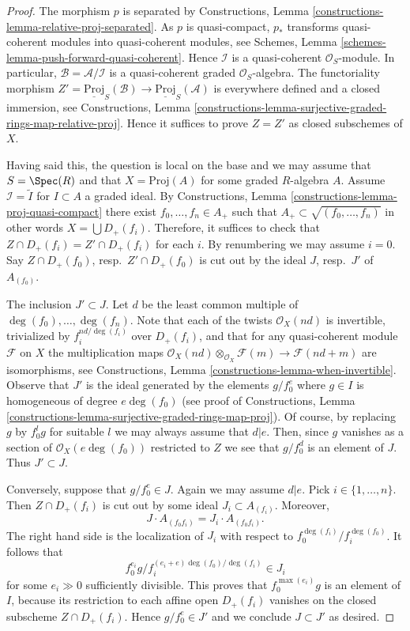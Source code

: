 \begin{proof}
The morphism $p$ is separated by
Constructions, Lemma \ref{constructions-lemma-relative-proj-separated}.
As $p$ is quasi-compact, $p_*$ transforms quasi-coherent modules
into quasi-coherent modules, see
Schemes, Lemma \ref{schemes-lemma-push-forward-quasi-coherent}.
Hence $\mathcal{I}$ is a quasi-coherent $\mathcal{O}_S$-module.
In particular, $\mathcal{B} = \mathcal{A}/\mathcal{I}$ is a
quasi-coherent graded $\mathcal{O}_S$-algebra. The functoriality
morphism $Z' = \underline{\text{Proj}}_S(\mathcal{B}) \to
\underline{\text{Proj}}_S(\mathcal{A})$ is everywhere defined and
a closed immersion, see Constructions, Lemma
\ref{constructions-lemma-surjective-graded-rings-map-relative-proj}.
Hence it suffices to prove $Z = Z'$ as closed subschemes of $X$.

\medskip\noindent
Having said this, the question is local on the base and we may assume
that $S = \Spec(R)$ and that $X = \text{Proj}(A)$ for some
graded $R$-algebra $A$. Assume $\mathcal{I} = \widetilde{I}$
for $I \subset A$ a graded ideal. By
Constructions, Lemma \ref{constructions-lemma-proj-quasi-compact}
there exist $f_0, \ldots, f_n \in A_{+}$ such that
$A_{+} \subset \sqrt{(f_0, \ldots, f_n)}$ in other words
$X = \bigcup D_{+}(f_i)$. Therefore, it suffices to check that
$Z \cap D_{+}(f_i) = Z' \cap D_{+}(f_i)$ for each $i$.
By renumbering we may assume $i = 0$.
Say $Z \cap D_{+}(f_0)$, resp.\ $Z' \cap D_{+}(f_0)$
is cut out by the ideal $J$, resp.\ $J'$ of $A_{(f_0)}$.

\medskip\noindent
The inclusion $J' \subset J$.
Let $d$ be the least common multiple of $\deg(f_0), \ldots, \deg(f_n)$.
Note that each of the twists $\mathcal{O}_X(nd)$ is invertible, trivialized
by $f_i^{nd/\deg(f_i)}$ over $D_{+}(f_i)$, and that for any quasi-coherent
module $\mathcal{F}$ on $X$ the multiplication maps
$\mathcal{O}_X(nd) \otimes_{\mathcal{O}_X} \mathcal{F}(m)
\to \mathcal{F}(nd + m)$ are isomorphisms, see
Constructions, Lemma \ref{constructions-lemma-when-invertible}.
Observe that $J'$ is the ideal generated by the elements $g/f_0^e$ where
$g \in I$ is homogeneous of degree $e\deg(f_0)$ (see proof of
Constructions, Lemma
\ref{constructions-lemma-surjective-graded-rings-map-proj}).
Of course, by replacing $g$ by $f_0^lg$ for suitable $l$
we may always assume that $d | e$. Then, since $g$ vanishes as a section of
$\mathcal{O}_X(e\deg(f_0))$ restricted to $Z$ we see that
$g/f_0^d$ is an element of $J$. Thus $J' \subset J$.

\medskip\noindent
Conversely, suppose that $g/f_0^e \in J$. Again we may assume $d | e$.
Pick $i \in \{1, \ldots, n\}$. Then $Z \cap D_{+}(f_i)$ is
cut out by some ideal $J_i \subset A_{(f_i)}$. Moreover,
$$
J \cdot A_{(f_0f_i)} = J_i \cdot A_{(f_0f_i)}.
$$
The right hand side is the localization of $J_i$ with respect to
$f_0^{\deg(f_i)}/f_i^{\deg(f_0)}$. It follows that
$$
f_0^{e_i}g/f_i^{(e_i + e)\deg(f_0)/\deg(f_i)} \in J_i
$$
for some $e_i \gg 0$ sufficiently divisible. This proves that
$f_0^{\max(e_i)}g$ is an element of $I$, because its restriction to each
affine open $D_{+}(f_i)$ vanishes on the closed subscheme
$Z \cap D_{+}(f_i)$. Hence $g/f_0^e \in J'$ and we conclude $J \subset J'$
as desired.
\end{proof}

